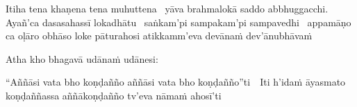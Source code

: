 \begin{pali-hang}
  Itiha tena khaṇena tena muhuttena \breathmark\ yāva brahmalokā saddo abbhuggacchi. Ayañ'ca dasasahassī lokadhātu \breathmark\ saṅkam'pi sampakam'pi sampavedhi \breathmark\ appamāṇo ca oḷāro obhāso loke pāturahosi atikkamm'eva devānaṁ dev'ānubhāvaṁ
\end{pali-hang}

Atha kho bhagavā udānaṁ udānesi:

\begin{pali-hang}
  ``Aññāsi vata bho koṇḍañño aññāsi vata bho koṇḍañño''\mbox{ti}~\breathmark\ Iti h'idaṁ āyasmato koṇḍaññassa aññākoṇḍañño tv'eva nāmaṁ ahosī'ti
\end{pali-hang}

\ifninebythirteenversion\vspace{-1em}\fi

\suttaRef{[SN 56.11]}

